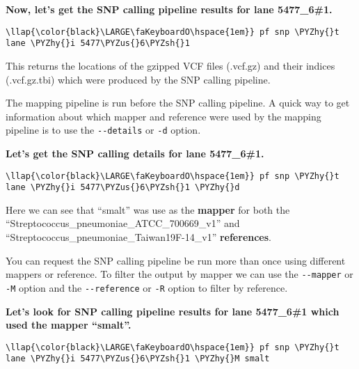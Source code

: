 \documentclass[11pt]{article}
\def\PYZus{\char`\_}
\def\PYZsh{\char`\#}
\def\PYZhy{\char`\-}
\begin{document}
    \textbf{Now, let's get the SNP calling pipeline results for lane
5477\_6\#1.}

\begin{terminalinput}
\begin{Verbatim}[commandchars=\\\{\}]
\llap{\color{black}\LARGE\faKeyboardO\hspace{1em}} pf snp \PYZhy{}t lane \PYZhy{}i 5477\PYZus{}6\PYZsh{}1
\end{Verbatim}
\end{terminalinput}

    This returns the locations of the gzipped VCF files (.vcf.gz) and their
indices (.vcf.gz.tbi) which were produced by the SNP calling pipeline.

The mapping pipeline is run before the SNP calling pipeline. A quick way
to get information about which mapper and reference were used by the
mapping pipeline is to use the \texttt{-\/-details} or \texttt{-d}
option.

\textbf{Let's get the SNP calling details for lane 5477\_6\#1.}

\begin{terminalinput}
\begin{Verbatim}[commandchars=\\\{\}]
\llap{\color{black}\LARGE\faKeyboardO\hspace{1em}} pf snp \PYZhy{}t lane \PYZhy{}i 5477\PYZus{}6\PYZsh{}1 \PYZhy{}d
\end{Verbatim}
\end{terminalinput}

    Here we can see that ``smalt'' was use as the \textbf{mapper} for both
the ``Streptococcus\_pneumoniae\_ATCC\_700669\_v1'' and
``Streptococcus\_pneumoniae\_Taiwan19F-14\_v1'' \textbf{references}.

You can request the SNP calling pipeline be run more than once using
different mappers or reference. To filter the output by mapper we can
use the \texttt{-\/-mapper} or \texttt{-M} option and the
\texttt{-\/-reference} or \texttt{-R} option to filter by reference.

\textbf{Let's look for SNP calling pipeline results for lane 5477\_6\#1
which used the mapper ``smalt''.}

\begin{terminalinput}
\begin{Verbatim}[commandchars=\\\{\}]
\llap{\color{black}\LARGE\faKeyboardO\hspace{1em}} pf snp \PYZhy{}t lane \PYZhy{}i 5477\PYZus{}6\PYZsh{}1 \PYZhy{}M smalt
\end{Verbatim}
\end{terminalinput}
\end{document}
